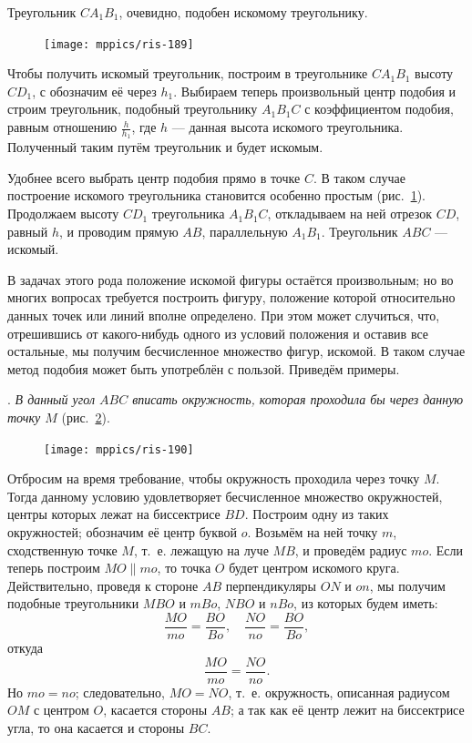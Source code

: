 \documentclass[oneside]{book}
\begin{document}
Треугольник $CA_1B_1$, очевидно, подобен искомому треугольнику.

\begin{figure}
\centering
\texttt{[image: mppics/ris-189]}
\caption{}\label{1938/ris-189}
\end{figure}

Чтобы получить искомый треугольник, построим в треугольнике $CA_1B_1$ высоту $CD_1$, с обозначим её через $h_1$.
Выбираем теперь произвольный центр подобия и строим треугольник, подобный треугольнику $A_1B_1C$ с коэффициентом подобия, равным отношению $\tfrac{h}{h_1}$,
где $h$ — данная высота искомого треугольника.
Полученный таким путём треугольник и будет искомым.

Удобнее всего выбрать центр подобия прямо в точке $C$.
В таком случае построение искомого треугольника становится особенно простым (рис.~\ref{1938/ris-189}).
Продолжаем высоту $CD_1$ треугольника $A_1B_1C$, откладываем на ней отрезок $CD$, равный $h$, и проводим прямую $AB$, параллельную $A_1B_1$.
Треугольник $ABC$ — искомый. 

\medskip

{\sloppy

В задачах этого рода положение искомой фигуры остаётся произвольным;
но во многих вопросах требуется построить фигуру, положение которой относительно данных точек или линий вполне определено.
При этом может случиться, что, отрешившись от какого-нибудь одного из условий положения и оставив все остальные, мы получим бесчисленное множество фигур,  искомой.
В таком случае метод подобия может быть употреблён с пользой.
Приведём примеры.

}

.
\emph{В данный угол $ABC$ вписать окружность, которая проходила бы через данную точку $M$} (рис.~\ref{1938/ris-190}).

\begin{figure}[h]
\centering
\texttt{[image: mppics/ris-190]}
\caption{}\label{1938/ris-190}
\end{figure}

Отбросим на время требование, чтобы окружность проходила через точку $M$.
Тогда данному условию удовлетворяет бесчисленное множество окружностей, центры которых лежат на биссектрисе $BD$.
Построим одну из таких окружностей; обозначим её центр буквой $o$. 
Возьмём на ней точку $m$, сходственную точке $M$, т.~е. лежащую на луче $MB$, и проведём радиус $mo$.
Если теперь построим $MO\parallel mo$, то точка $O$ будет центром искомого круга.
Действительно, проведя к стороне $AB$ перпендикуляры $ON$ и $on$, мы получим подобные треугольники $MBO$ и $mBo$, $NBO$ и $nBo$, из которых будем иметь:
\[\frac{MO}{mo} = \frac{BO}{Bo}, \quad 
 \frac{NO}{no} = \frac{BO}{Bo},
\]
откуда 
\[\frac{MO}{mo} = \frac{NO}{no}.\]
Но $mo =no$;
следовательно, $MO=NO$, т.~е. окружность, описанная радиусом $OM$ с центром $O$, касается стороны $AB$;
а так как её центр лежит на биссектрисе угла, то она касается и стороны $BC$.
\end{document}
